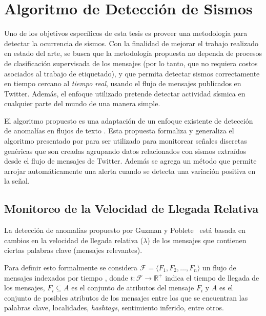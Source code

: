 \chapter{Algoritmo de Detección de Sismos}

Uno de los objetivos específicos de esta tesis es proveer una metodología para detectar la ocurrencia de sismos. Con la finalidad de mejorar el trabajo realizado en estado del arte, se busca que la metodología propuesta no dependa de procesos de clasificación supervisada de los mensajes (por lo tanto, que no requiera costos asociados al trabajo de etiquetado), y que permita detectar sismos correctamente en tiempo cercano al \textit{tiempo real}, usando el flujo de mensajes publicados en Twitter. Además, el enfoque utilizado pretende detectar actividad sísmica en cualquier parte del mundo de una manera simple. 

El algoritmo propuesto es una adaptación de un enfoque existente de detección de anomalías en flujos de texto . Esta propuesta formaliza y generaliza el algoritmo presentado por  para ser utilizado para monitorear señales discretas genéricas que son creadas agrupando datos relacionados con sismos extraídos desde el flujo de mensajes de Twitter. Además se agrega un método que permite arrojar automáticamente una alerta cuando se detecta una variación positiva en la señal.


\section{Monitoreo de la Velocidad de Llegada Relativa}

La detección de anomalías propuesto por Guzman y Poblete~\cite{guzman2013line} está basada en cambios en la velocidad de llegada relativa ($\lambda$) de los mensajes que contienen ciertas palabras clave (mensajes relevantes).

Para definir esto formalmente se considera ${\mathcal F} = \langle F_1, F_2, \dots, F_n \rangle$ un flujo de mensajes indexados por tiempo , donde  $t: {\mathcal F} \rightarrow \mathbb{R}^+$ indica el tiempo de llegada de los mensajes, $F_i \subseteq A$ es el conjunto de atributos del mensaje $F_i$ y $A$ es el conjunto de posibles atributos de los mensajes entre los que se encuentran las palabras clave, localidades, \textit{hashtags}, sentimiento inferido, entre otros.  


